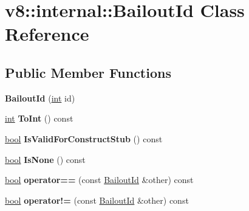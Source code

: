 \hypertarget{classv8_1_1internal_1_1BailoutId}{}\section{v8\+:\+:internal\+:\+:Bailout\+Id Class Reference}
\label{classv8_1_1internal_1_1BailoutId}
\subsection*{Public Member Functions}
\begin{DoxyCompactItemize}
\item 
\mbox{\label{classv8_1_1internal_1_1BailoutId_a29bee41095d1f83d33c1e519877b324e}} 
{\bfseries Bailout\+Id} (\mbox{\hyperlink{classint}{int}} id)
\item 
\mbox{\label{classv8_1_1internal_1_1BailoutId_ab73c227f48e4a0b6d80bb70bb8da73c3}} 
\mbox{\hyperlink{classint}{int}} {\bfseries To\+Int} () const
\item 
\mbox{\label{classv8_1_1internal_1_1BailoutId_af93d424a536786b205ba22dfae45a621}} 
\mbox{\hyperlink{classbool}{bool}} {\bfseries Is\+Valid\+For\+Construct\+Stub} () const
\item 
\mbox{\label{classv8_1_1internal_1_1BailoutId_a73c29cc5561a7197cedac2e33c8eed63}} 
\mbox{\hyperlink{classbool}{bool}} {\bfseries Is\+None} () const
\item 
\mbox{\label{classv8_1_1internal_1_1BailoutId_acefb28c72d044418fb470b3dea215017}} 
\mbox{\hyperlink{classbool}{bool}} {\bfseries operator==} (const \mbox{\hyperlink{classv8_1_1internal_1_1BailoutId}{Bailout\+Id}} \&other) const
\item 
\mbox{\label{classv8_1_1internal_1_1BailoutId_aac8fa905224c108d35d63a4fb77a8094}} 
\mbox{\hyperlink{classbool}{bool}} {\bfseries operator!=} (const \mbox{\hyperlink{classv8_1_1internal_1_1BailoutId}{Bailout\+Id}} \&other) const
\end{DoxyCompactItemize}
